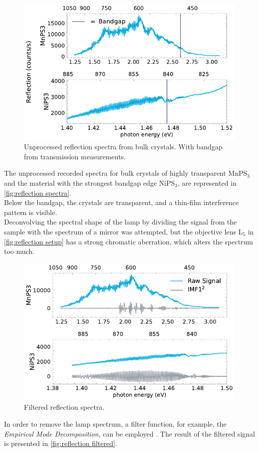 \documentclass[
	oneside,
	parskip=half,
	a4paper,
]{scrbook}
\begin{document}
\begin{figure}
	\centering
	\includegraphics{../figures/2024-03-14 reflection spectra.pdf}
	\caption{Unprocessed reflection spectra from bulk crystals. With bandgap from transmission measurements.}
	\label{fig:reflection spectra}
\end{figure}
The unprocessed recorded spectra for bulk crystals of highly transparent MnPS$_3$ and the material with the strongest bandgap edge NiPS$_3$, are represented in \autoref{fig:reflection spectra}.\\
Below the bandgap, the crystals are transparent, and a thin-film interference pattern is visible.\\
Deconvolving the spectral shape of the lamp by dividing the signal from the sample with the spectrum of a mirror was attempted, but the objective lens L$_5$ in \autoref{fig:reflection setup} has a strong chromatic aberration, which alters the spectrum too much.

\begin{figure}
	\centering
	\includegraphics{../figures/2024-03-14 reflection spectra IMF.pdf}
	\caption{Filtered reflection spectra.}
	\label{fig:reflection filtered}
\end{figure}
In order to remove the lamp spectrum, a filter function, for example, the \textit{Empirical Mode Decomposition}, can be employed \cite{thickness}.
The result of the filtered signal is presented in \autoref{fig:reflection filtered}.
\end{document}
